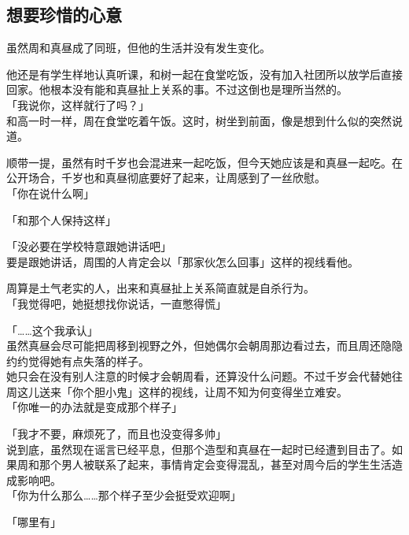 \subsection{想要珍惜的心意}

虽然周和真昼成了同班，但他的生活并没有发生变化。

他还是有学生样地认真听课，和树一起在食堂吃饭，没有加入社团所以放学后直接回家。他根本没有能和真昼扯上关系的事。不过这倒也是理所当然的。\\

「我说你，这样就行了吗？」\\

和高一时一样，周在食堂吃着午饭。这时，树坐到前面，像是想到什么似的突然说道。

顺带一提，虽然有时千岁也会混进来一起吃饭，但今天她应该是和真昼一起吃。在公开场合，千岁也和真昼彻底要好了起来，让周感到了一丝欣慰。\\

「你在说什么啊」

「和那个人保持这样」

「没必要在学校特意跟她讲话吧」\\

要是跟她讲话，周围的人肯定会以「那家伙怎么回事」这样的视线看他。

周算是土气老实的人，出来和真昼扯上关系简直就是自杀行为。\\

「我觉得吧，她挺想找你说话，一直憋得慌」

「……这个我承认」\\

虽然真昼会尽可能把周移到视野之外，但她偶尔会朝周那边看过去，而且周还隐隐约约觉得她有点失落的样子。\\

她只会在没有别人注意的时候才会朝周看，还算没什么问题。不过千岁会代替她往周这儿送来「你个胆小鬼」这样的视线，让周不知为何变得坐立难安。\\

「你唯一的办法就是变成那个样子」

「我才不要，麻烦死了，而且也没变得多帅」\\

说到底，虽然现在谣言已经平息，但那个造型和真昼在一起时已经遭到目击了。如果周和那个男人被联系了起来，事情肯定会变得混乱，甚至对周今后的学生生活造成影响吧。\\

「你为什么那么……那个样子至少会挺受欢迎啊」

「哪里有」\\

